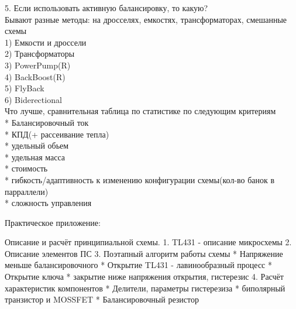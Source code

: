 5. Если использовать активную балансировку, то какую?  \\
    Бывают разные методы: на дросселях, емкостях, трансформаторах, смешанные схемы \\
    1) Емкости и дроссели \\
    2) Трансформаторы \\
    3) PowerPump(R) \\
    4) BackBoost(R) \\
    5) FlyBack \\
    6) Biderectional \\

    Что лучше, сравнительная таблица по статистике по следующим критериям \\
    * Балансировочный ток \\
    * КПД(+ рассеивание тепла) \\
    * удельный обьем \\
    * удельная масса \\
    * стоимость \\
    * гибкость/адаптивность к изменению конфигурации схемы(кол-во банок в парраллели) \\
    * сложность управления


Практическое приложение:

Описание и расчёт принципиальной схемы.
1. TL431 - описание микросхемы
2. Описание элементов ПС
3. Поэтапный алгоритм работы схемы
    * Напряжение меньше балансировочного
    * Открытие TL431 - лавинообразный процесс
    * Открытие ключа
    * закрытие ниже напряжения открытия, гистерезис
4. Расчёт характеристик компонентов
    * Делители, параметры гистерезиза
    * биполярный транзистор и MOSSFET
    * Балансировочный резистор





